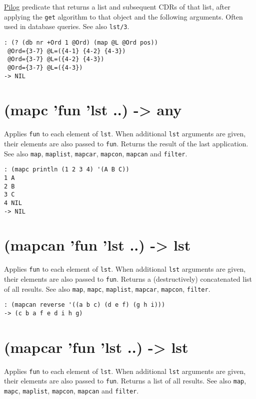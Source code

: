{{{{{{{\hyperref[ref.html-pilog]{Pilog} predicate that returns a list and subsequent
CDRs of that list, after applying the \texttt{get} algorithm to that object and
the following arguments. Often used in database queries. See also
\texttt{lst/3}.


\begin{verbatim}
: (? (db nr +Ord 1 @Ord) (map @L @Ord pos))
 @Ord={3-7} @L=({4-1} {4-2} {4-3})
 @Ord={3-7} @L=({4-2} {4-3})
 @Ord={3-7} @L=({4-3})
-> NIL
\end{verbatim}

 
\section{(mapc 'fun 'lst ..) -> any}
\label{sec-8-1-13-9}


Applies \texttt{fun} to each element of \texttt{lst}. When additional \texttt{lst} arguments
are given, their elements are also passed to \texttt{fun}. Returns the result
of the last application. See also \texttt{map}, \texttt{maplist}, \texttt{mapcar}, \texttt{mapcon},
\texttt{mapcan} and \texttt{filter}.


\begin{verbatim}
: (mapc println (1 2 3 4) '(A B C))
1 A
2 B
3 C
4 NIL
-> NIL
\end{verbatim}

 
\section{(mapcan 'fun 'lst ..) -> lst}
\label{sec-8-1-13-10}


Applies \texttt{fun} to each element of \texttt{lst}. When additional \texttt{lst} arguments
are given, their elements are also passed to \texttt{fun}. Returns a
(destructively) concatenated list of all results. See also \texttt{map},
\texttt{mapc}, \texttt{maplist}, \texttt{mapcar}, \texttt{mapcon}, \texttt{filter}.


\begin{verbatim}
: (mapcan reverse '((a b c) (d e f) (g h i)))
-> (c b a f e d i h g)
\end{verbatim}

 
\section{(mapcar 'fun 'lst ..) -> lst}
\label{sec-8-1-13-11}


Applies \texttt{fun} to each element of \texttt{lst}. When additional \texttt{lst} arguments
are given, their elements are also passed to \texttt{fun}. Returns a list of
all results. See also \texttt{map}, \texttt{mapc}, \texttt{maplist}, \texttt{mapcon}, \texttt{mapcan} and
\texttt{filter}.


}}}}}}}
